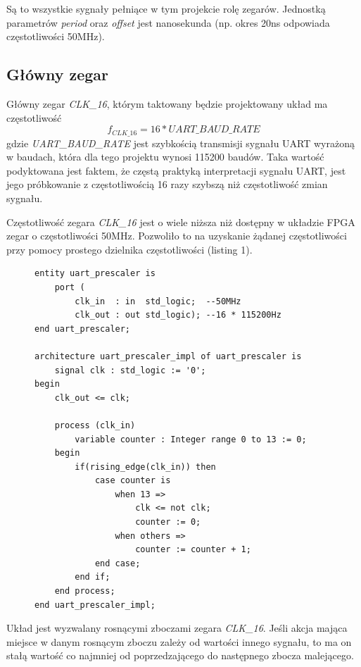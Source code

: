 Są to wszystkie sygnały pełniące w tym projekcie rolę zegarów. Jednostką parametrów \textit{period} oraz \textit{offset} jest nanosekunda (np. okres 20ns odpowiada częstotliwości 50MHz).

\subsection{Główny zegar}
\label{sec:clk-16}
Główny zegar \textit{CLK\_16}, którym taktowany będzie projektowany układ ma częstotliwość
\begin{equation}
f_{CLK\_16} = 16 * UART\_BAUD\_RATE
\end{equation}
gdzie \textit{UART\_BAUD\_RATE} jest szybkością transmisji sygnału UART wyrażoną w baudach, która dla tego projektu wynosi 115200 baudów. Taka wartość podyktowana jest faktem, że częstą praktyką interpretacji sygnału UART, jest jego próbkowanie z częstotliwością 16 razy szybszą niż częstotliwość zmian sygnału.

Częstotliwość zegara \textit{CLK\_16} jest o wiele niższa niż dostępny w układzie FPGA zegar o częstotliwości 50MHz. Pozwoliło to na uzyskanie żądanej częstotliwości przy pomocy prostego dzielnika częstotliwości (listing 1).

\begin{figure}[!h]
\begin{lstlisting}[style=vhdl, caption={Dzielnik częstotliwości \textit{uart\_prescaler}}, captionpos=b]
entity uart_prescaler is
	port (
		clk_in  : in  std_logic;  --50MHz
		clk_out : out std_logic); --16 * 115200Hz
end uart_prescaler;

architecture uart_prescaler_impl of uart_prescaler is
	signal clk : std_logic := '0';
begin
	clk_out <= clk;
	
	process (clk_in) 
		variable counter : Integer range 0 to 13 := 0;
	begin	
		if(rising_edge(clk_in)) then
			case counter is
				when 13 =>
					clk <= not clk;
					counter := 0;
				when others =>
					counter := counter + 1;
			end case;
		end if;
	end process;
end uart_prescaler_impl;
\end{lstlisting}
\end{figure}

Układ jest wyzwalany rosnącymi zboczami zegara \textit{CLK\_16}. Jeśli akcja mająca miejsce w danym rosnącym zboczu zależy od wartości innego sygnału, to ma on stałą wartość co najmniej od poprzedzającego do następnego zbocza malejącego.

